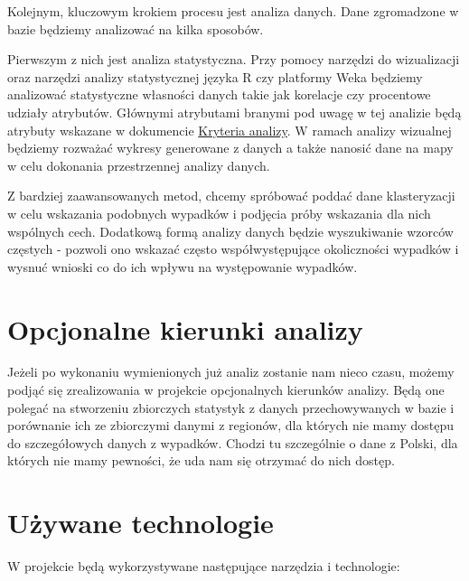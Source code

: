 Kolejnym, kluczowym krokiem procesu jest analiza danych. Dane
zgromadzone w bazie będziemy analizować na kilka sposobów.

Pierwszym z nich jest analiza statystyczna. Przy pomocy narzędzi do
wizualizacji oraz narzędzi analizy statystycznej języka R czy platformy
Weka będziemy analizować statystyczne własności danych takie jak
korelacje czy procentowe udziały atrybutów. Głównymi atrybutami branymi
pod uwagę w tej analizie będą atrybuty wskazane w dokumencie
\href{Kryteria-analizy}{Kryteria analizy}. W ramach analizy wizualnej
będziemy rozważać wykresy generowane z danych a także nanosić dane na
mapy w celu dokonania przestrzennej analizy danych.

Z bardziej zaawansowanych metod, chcemy spróbować poddać dane
klasteryzacji w celu wskazania podobnych wypadków i podjęcia próby
wskazania dla nich wspólnych cech. Dodatkową formą analizy danych będzie
wyszukiwanie wzorców częstych - pozwoli ono wskazać często
współwystępujące okoliczności wypadków i wysnuć wnioski co do ich wpływu
na występowanie wypadków.

\section{Opcjonalne kierunki analizy}\label{opcjonalne-kierunki-analizy}

Jeżeli po wykonaniu wymienionych już analiz zostanie nam nieco czasu,
możemy podjąć się zrealizowania w projekcie opcjonalnych kierunków
analizy. Będą one polegać na stworzeniu zbiorczych statystyk z danych
przechowywanych w bazie i porównanie ich ze zbiorczymi danymi z
regionów, dla których nie mamy dostępu do szczegółowych danych z
wypadków. Chodzi tu szczególnie o dane z Polski, dla których nie mamy
pewności, że uda nam się otrzymać do nich dostęp.

\section{Używane technologie}\label{uzywane-technologie}

W projekcie będą wykorzystywane następujące narzędzia i technologie:

